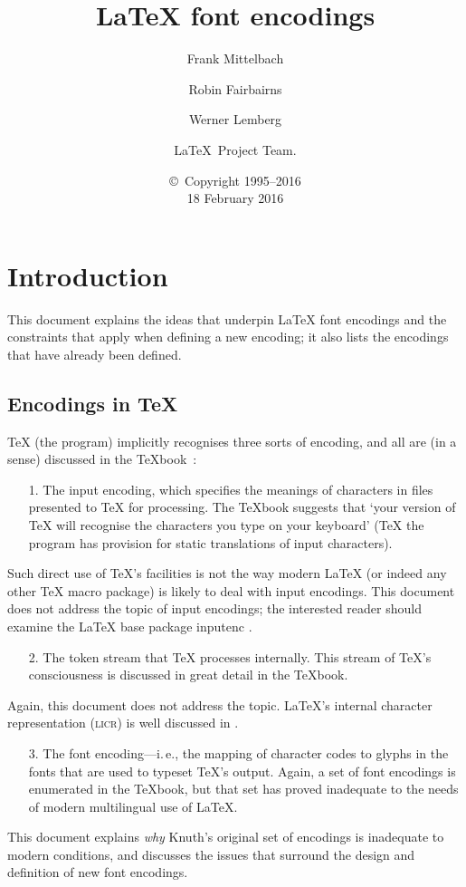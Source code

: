 \documentclass{ltxguide}[1994/11/20]
\title{\LaTeX{} font encodings}
\author{Frank Mittelbach \and Robin
   Fairbairns \and Werner Lemberg \and \LaTeX\ Project Team.}
\date{\copyright~Copyright 1995--2016 \\[5pt] 18 February 2016}
\providecommand{\Pkg}[1]{%
  \textsf{#1}}
\begin{document}
\maketitle

\tableofcontents

\section{Introduction}

This document explains the ideas that underpin \LaTeX{} font
encodings and the constraints that apply when defining a new encoding; it
also lists the encodings that have already been defined.

\subsection{Encodings in \TeX{}}

\TeX{} (the program) implicitly recognises three sorts of encoding,
and all are (in a sense) discussed in the \TeX{}book~\cite{A-W:DKn86}:
\begin{itemize}
\item[1.] The input encoding, which specifies the meanings of characters
  in files presented to \TeX{} for processing.  The \TeX{}book
  suggests that `your version of \TeX{} will recognise the characters
  you type on your keyboard' (\TeX{} the program has provision for
  static translations of input characters).
\end{itemize}
Such direct use of \TeX{}'s facilities is not the way modern
\LaTeX{} (or indeed any other \TeX{} macro package) is likely to deal
with input encodings.   This document does not address the topic of
input encodings; the interested reader should examine the \LaTeX{}
base package \Pkg{inputenc} \cite[sec.~7.5.2, p.~357]{A-W:MG2004}.
\begin{itemize}
\item[2.] The token stream that \TeX{} processes internally.  This stream
  of \TeX{}'s consciousness is discussed in great detail in the
  \TeX{}book.
\end{itemize}
Again, this document does not address the topic.  \LaTeX's internal
character representation (\textsc{licr}) is well discussed in
\cite[sec.~7.11.2, p.~442]{A-W:MG2004}.
\begin{itemize}
\item[3.] The font encoding---i.\,e., the mapping of character codes to
  glyphs in the fonts that are used to typeset \TeX{}'s output.
  Again, a set of font encodings is enumerated in the \TeX{}book, but
  that set has proved inadequate to the needs of modern multilingual
  use of \LaTeX.
\end{itemize}
This document explains \emph{why} Knuth's original set of encodings is
inadequate to modern conditions, and discusses the issues that
surround the design and definition of new font encodings.
\end{document}
